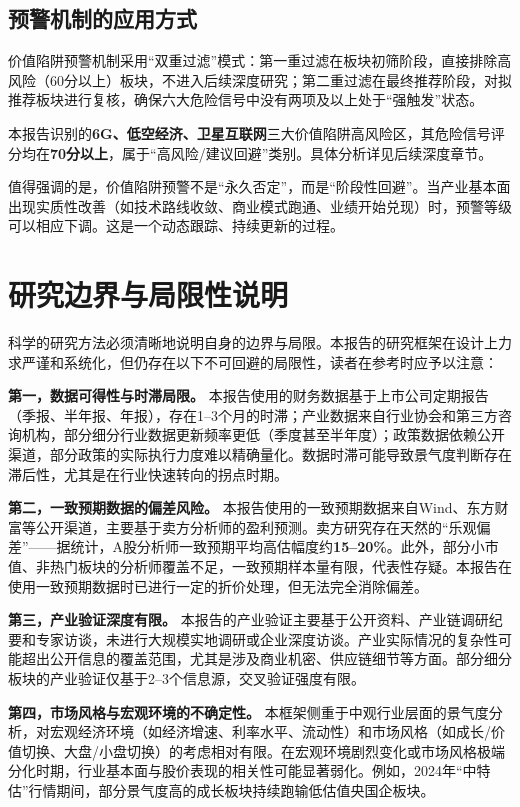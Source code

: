 \subsection{预警机制的应用方式}

价值陷阱预警机制采用“双重过滤”模式：第一重过滤在板块初筛阶段，直接排除高风险（60分以上）板块，不进入后续深度研究；第二重过滤在最终推荐阶段，对拟推荐板块进行复核，确保六大危险信号中没有两项及以上处于“强触发”状态。

本报告识别的\textbf{6G、低空经济、卫星互联网}三大价值陷阱高风险区，其危险信号评分均在\textbf{70分以上}，属于“高风险/建议回避”类别。具体分析详见后续深度章节。

值得强调的是，价值陷阱预警不是“永久否定”，而是“阶段性回避”。当产业基本面出现实质性改善（如技术路线收敛、商业模式跑通、业绩开始兑现）时，预警等级可以相应下调。这是一个动态跟踪、持续更新的过程。

\section{研究边界与局限性说明}

科学的研究方法必须清晰地说明自身的边界与局限。本报告的研究框架在设计上力求严谨和系统化，但仍存在以下不可回避的局限性，读者在参考时应予以注意：

\textbf{第一，数据可得性与时滞局限。} 本报告使用的财务数据基于上市公司定期报告（季报、半年报、年报），存在1--3个月的时滞；产业数据来自行业协会和第三方咨询机构，部分细分行业数据更新频率更低（季度甚至半年度）；政策数据依赖公开渠道，部分政策的实际执行力度难以精确量化。数据时滞可能导致景气度判断存在滞后性，尤其是在行业快速转向的拐点时期。

\textbf{第二，一致预期数据的偏差风险。} 本报告使用的一致预期数据来自Wind、东方财富等公开渠道，主要基于卖方分析师的盈利预测。卖方研究存在天然的“乐观偏差”——据统计，A股分析师一致预期平均高估幅度约\textbf{15--20\%}。此外，部分小市值、非热门板块的分析师覆盖不足，一致预期样本量有限，代表性存疑。本报告在使用一致预期数据时已进行一定的折价处理，但无法完全消除偏差。

\textbf{第三，产业验证深度有限。} 本报告的产业验证主要基于公开资料、产业链调研纪要和专家访谈，未进行大规模实地调研或企业深度访谈。产业实际情况的复杂性可能超出公开信息的覆盖范围，尤其是涉及商业机密、供应链细节等方面。部分细分板块的产业验证仅基于2--3个信息源，交叉验证强度有限。

\textbf{第四，市场风格与宏观环境的不确定性。} 本框架侧重于中观行业层面的景气度分析，对宏观经济环境（如经济增速、利率水平、流动性）和市场风格（如成长/价值切换、大盘/小盘切换）的考虑相对有限。在宏观环境剧烈变化或市场风格极端分化时期，行业基本面与股价表现的相关性可能显著弱化。例如，2024年“中特估”行情期间，部分景气度高的成长板块持续跑输低估值央国企板块。

